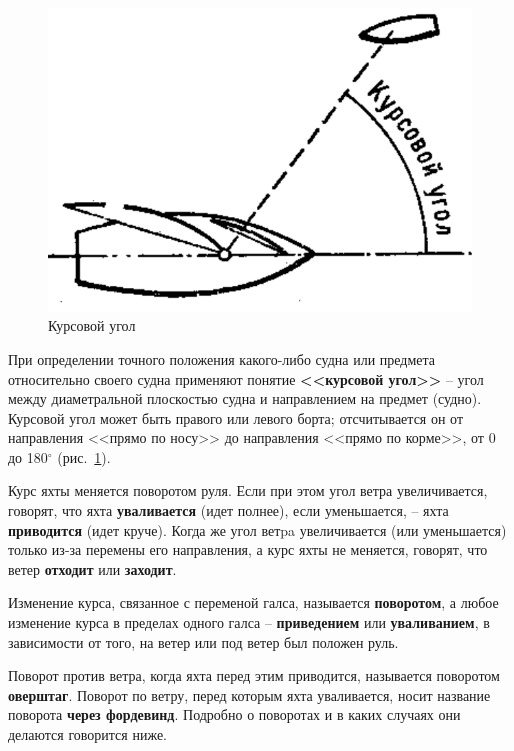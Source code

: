 \documentclass[a4paper, 12pt, twoside, final]{scrbook}
\begin{document}
\begin{figure}[htbp]
   \centering
   \includegraphics{102_Kursovoj_ugol} %
   \caption{Курсовой угол}
   \label{fig:102}
\end{figure}

При определении точного положения какого-либо судна или предмета относительно своего судна применяют понятие \textbf{<<курсовой угол>>} \--- угол между диаметральной плоскостью судна и направлением на предмет (судно). Курсовой угол может быть правого или левого борта; отсчитывается он от направления <<прямо по носу>> до направления <<прямо по корме>>, от 0 до 180$^\circ$ (рис.~\ref{fig:102}).

Курс яхты меняется поворотом руля. Если при этом угол ветра увеличивается, говорят, что яхта \textbf{уваливается} (идет полнее), если уменьшается, \--- яхта \textbf{приводится} (идет круче). Когда же угол ветpa увеличивается (или уменьшается) только из-за перемены его направления, а курс яхты не меняется, говорят, что ветер \textbf{отходит} или \textbf{заходит}.

Изменение курса, связанное с переменой галса, называется \textbf{поворотом}, а любое изменение курса в пределах одного галса \--- \textbf{приведением} или \textbf{уваливанием}, в зависимости от того, на ветер или под ветер был положен руль. 

Поворот против ветра, когда яхта перед этим приводится, называется поворотом \textbf{оверштаг}. Поворот по ветру, перед которым яхта уваливается, носит название поворота \textbf{через фордевинд}. Подробно о поворотах и в каких случаях они делаются говорится ниже.
\end{document}
